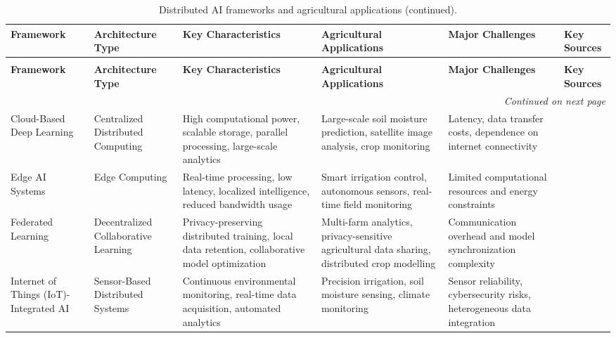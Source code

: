 \documentclass[land,article,submit,pdftex,moreauthors]{Definitions/mdpi}
\numberwithin{equation}{section}
\begin{document}
\begin{longtable}{p{1.4cm} p{1.4cm} p{3.2cm} p{3.2cm} p{2.4cm} p{1.6cm}}
\caption{Distributed AI frameworks and agricultural applications.}
\label{tab:distributed_ai} \\
\toprule
\textbf{Framework} &
\textbf{Architecture Type} &
\textbf{Key Characteristics} &
\textbf{Agricultural Applications} &
\textbf{Major Challenges} &
\textbf{Key Sources} \\
\midrule
\endfirsthead

\caption[]{Distributed AI frameworks and agricultural applications (continued).} \\
\toprule
\textbf{Framework} &
\textbf{Architecture Type} &
\textbf{Key Characteristics} &
\textbf{Agricultural Applications} &
\textbf{Major Challenges} &
\textbf{Key Sources} \\
\midrule
\endhead

\midrule
\multicolumn{6}{r}{\footnotesize\textit{Continued on next page}} \\
\midrule
\endfoot

\bottomrule
\endlastfoot

Cloud-Based Deep Learning &
Centralized Distributed Computing &
High computational power, scalable storage, parallel processing, large-scale analytics &
Large-scale soil moisture prediction, satellite image analysis, crop monitoring &
Latency, data transfer costs, dependence on internet connectivity &
\citep{Morchid2026, Kamilaris2018, Liakos2018} \\ \hline

Edge AI Systems &
Edge Computing &
Real-time processing, low latency, localized intelligence, reduced bandwidth usage &
Smart irrigation control, autonomous sensors, real-time field monitoring &
Limited computational resources and energy constraints &
\citep{Martinez2025, Nguyen2026, Ota2017, Zhu2021} \\ \hline

Federated Learning &
Decentralized Collaborative Learning &
Privacy-preserving distributed training, local data retention, collaborative model optimization &
Multi-farm analytics, privacy-sensitive agricultural data sharing, distributed crop modelling &
Communication overhead and model synchronization complexity &
\citep{FederatedAgri2025, Yang2019, McMahan2017, Li2020_FL} \\ \hline

Internet of Things (IoT)-Integrated AI &
Sensor-Based Distributed Systems &
Continuous environmental monitoring, real-time data acquisition, automated analytics &
Precision irrigation, soil moisture sensing, climate monitoring &
Sensor reliability, cybersecurity risks, heterogeneous data integration &
\citep{Paria2025, Khanna2019, Ayaz2019} \\ \hline


\end{longtable}
\end{document}
